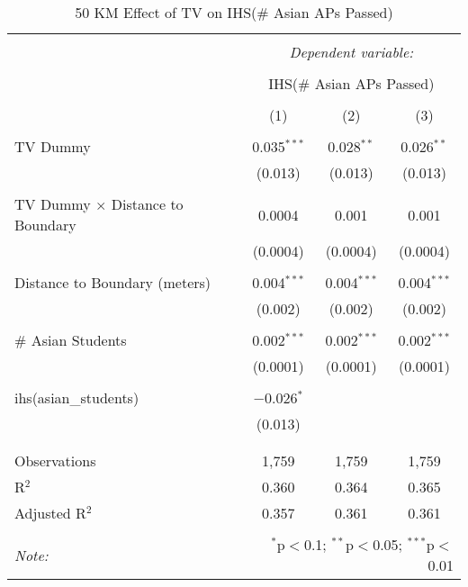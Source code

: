 
\begin{table}[!htbp] \centering 
  \caption{50 KM Effect of TV on IHS(\# Asian APs Passed)} 
  \label{} 
\begin{tabular}{@{\extracolsep{-2pt}}lccc} 
\\[-1.8ex]\hline 
\hline \\[-1.8ex] 
 & \multicolumn{3}{c}{\textit{Dependent variable:}} \\ 
\cline{2-4} 
\\[-1.8ex] & \multicolumn{3}{c}{IHS(\# Asian APs Passed)} \\ 
\\[-1.8ex] & (1) & (2) & (3)\\ 
\hline \\[-1.8ex] 
 TV Dummy & 0.035$^{***}$ & 0.028$^{**}$ & 0.026$^{**}$ \\ 
  & (0.013) & (0.013) & (0.013) \\ 
  & & & \\ 
 TV Dummy $\times$ Distance to Boundary & 0.0004 & 0.001 & 0.001 \\ 
  & (0.0004) & (0.0004) & (0.0004) \\ 
  & & & \\ 
 Distance to Boundary (meters) & 0.004$^{***}$ & 0.004$^{***}$ & 0.004$^{***}$ \\ 
  & (0.002) & (0.002) & (0.002) \\ 
  & & & \\ 
 \# Asian Students & 0.002$^{***}$ & 0.002$^{***}$ & 0.002$^{***}$ \\ 
  & (0.0001) & (0.0001) & (0.0001) \\ 
  & & & \\ 
 ihs(asian\_students) & $-$0.026$^{*}$ &  &  \\ 
  & (0.013) &  &  \\ 
  & & & \\ 
\hline \\[-1.8ex] 
Observations & 1,759 & 1,759 & 1,759 \\ 
R$^{2}$ & 0.360 & 0.364 & 0.365 \\ 
Adjusted R$^{2}$ & 0.357 & 0.361 & 0.361 \\ 
\hline 
\hline \\[-1.8ex] 
\textit{Note:}  & \multicolumn{3}{r}{$^{*}$p$<$0.1; $^{**}$p$<$0.05; $^{***}$p$<$0.01} \\ 
\end{tabular} 
\end{table} 

